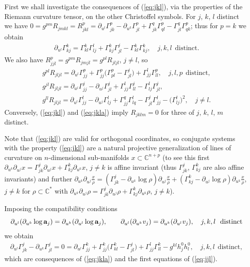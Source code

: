 \documentclass[pdftex]{sigma}
\begin{document}
First we shall investigate the consequences of (\ref{eq:jkl}), via
the properties of the Riemann curvature tensor, on the other
Christof\/fel symbols. For $j$, $k$, $l$ distinct we have
$0=g^{pm}R_{jmkl}=R^p_{jkl}=\partial_{u^l}\Gamma_{jk}^p-\partial_{u^k}\Gamma_{jl}^p+\Gamma_{jk}^q\Gamma_{ql}^p
-\Gamma_{jl}^q\Gamma_{qk}^p$; thus for $p=k$ we obtain
\begin{gather}
\partial_{u^l}\Gamma_{kj}^k=\Gamma_{kl}^k\Gamma_{lj}^l+\Gamma_{kj}^k\Gamma_{jl}^j-\Gamma_{kl}^k\Gamma_{kj}^k,\quad
j,k,l\ \ \mathrm{distinct}.\label{eq:jkla}
\end{gather}
We also have $R^p_{jjl}=g^{pm}R_{jmjl}=g^{pl}R_{jljl}$, $j\neq l$,
so
\begin{gather}
g^{pl}R_{jljl}=\partial_{u^l}\Gamma_{jj}^p+\Gamma_{jj}^p\big(\Gamma_{pl}^p-\Gamma_{jl}^j\big)
+\Gamma_{jj}^l\Gamma_{ll}^p,\quad j,l,p\ \
\mathrm{distinct},\nonumber\\
g^{jl}R_{jljl}=\partial_{u^l}\Gamma_{jj}^j-\partial_{u^j}\Gamma_{jl}^j
+\Gamma_{jj}^l\Gamma_{ll}^j
-\Gamma_{lj}^l\Gamma_{jl}^j,\nonumber\\
g^{ll}R_{jljl}=\partial_{u^l}\Gamma_{jj}^l-\partial_{u^j}\Gamma_{lj}^l
+\Gamma_{jj}^q\Gamma_{lq}^l-\Gamma_{jl}^j\Gamma_{jj}^l
-\big(\Gamma_{lj}^l\big)^2,\quad j\neq l.\label{eq:jjl}
\end{gather}
Conversely, (\ref{eq:jkl}) and (\ref{eq:jkla}) imply $R_{jklm}=0$
for three of $j$, $k$, $l$, $m$ distinct.

\begin{remark}
Note that (\ref{eq:jkl}) are valid for orthogonal coordinates, so
conjugate systems with the property (\ref{eq:jkl}) are a natural
projective generalization of lines of curvature on $n$-dimensional
sub-manifolds $x\subset\mathbb{C}^{n+p}$ (to see this f\/irst
$\partial_{u^k}\partial_{u^j}x=\Gamma_{jk}^j\partial_{u^j}x+\Gamma_{kj}^k\partial_{u^k}x$,
$j\neq k$ is af\/f\/ine invariant (thus $\Gamma_{jk}^j$, $\Gamma_{kj}^k$
are also af\/f\/ine invariants) and further
$\partial_{u^k}\partial_{u^j}\frac{x}{\rho}=(\Gamma_{jk}^j-\partial_{u^k}\log\rho)\partial_{u^j}\frac{x}{\rho}
+(\Gamma_{kj}^k-\partial_{u^j}\log\rho)\partial_{u^k}\frac{x}{\rho}$, $
j\neq k$ for $\rho\subset\mathbb{C}^*$ with
$\partial_{u^k}\partial_{u^j}\rho=\Gamma_{jk}^j\partial_{u^j}\rho+\Gamma_{kj}^k\partial_{u^k}\rho$, $j\neq k$).
\end{remark}

Imposing the compatibility conditions
\[
\partial_{u^l}(\partial_{u^k}\log\mathbf{a}_j)=\partial_{u^k}(\partial_{u^l}\log\mathbf{a}_j),\qquad
\partial_{u^l}(\partial_{u^k}v_j)=\partial_{u^k}(\partial_{u^l}v_j),\quad  j,k,l \ \ {\rm  distinct}
\]
we obtain
\begin{gather}
\partial_{u^l}\Gamma_{jk}^j-\partial_{u^k}\Gamma_{jl}^j=0=
\partial_{u^l}\Gamma_{jj}^k+\Gamma_{jj}^k\big(\Gamma_{kl}^k
-\Gamma_{jl}^j\big)+\Gamma_{jj}^l\Gamma_{ll}^k-g^{kl}h_j^0h_l^0,\quad
j,k,l\ \ \mathrm{distinct},\label{eq:com}
\end{gather}
which are consequences of (\ref{eq:jkla}) and the f\/irst equations
of (\ref{eq:jjl}).
\end{document}
